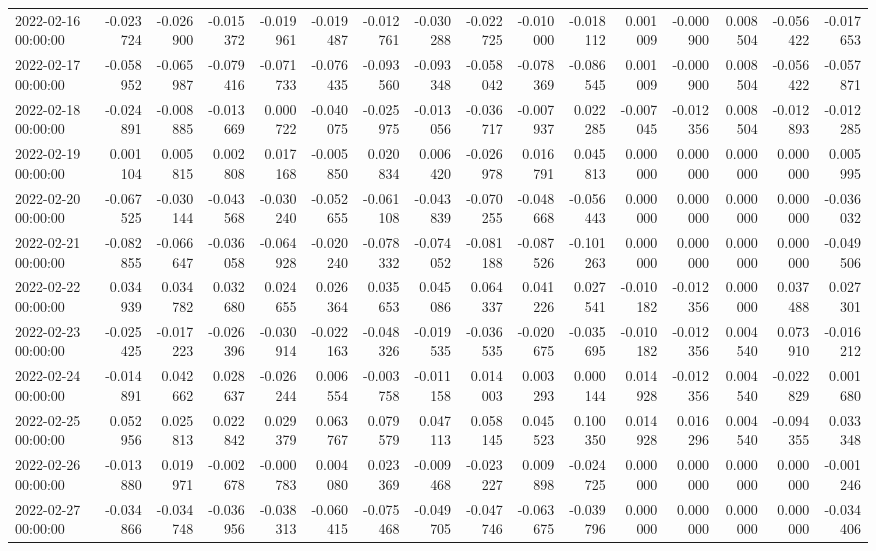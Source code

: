 \begin{tabular}{lrrrrrrrrrrrrrrr}
2022-02-16 00:00:00 & -0.023724 & -0.026900 & -0.015372 & -0.019961 & -0.019487 & -0.012761 & -0.030288 & -0.022725 & -0.010000 & -0.018112 & 0.001009 & -0.000900 & 0.008504 & -0.056422 & -0.017653 \\
2022-02-17 00:00:00 & -0.058952 & -0.065987 & -0.079416 & -0.071733 & -0.076435 & -0.093560 & -0.093348 & -0.058042 & -0.078369 & -0.086545 & 0.001009 & -0.000900 & 0.008504 & -0.056422 & -0.057871 \\
2022-02-18 00:00:00 & -0.024891 & -0.008885 & -0.013669 & 0.000722 & -0.040075 & -0.025975 & -0.013056 & -0.036717 & -0.007937 & 0.022285 & -0.007045 & -0.012356 & 0.008504 & -0.012893 & -0.012285 \\
2022-02-19 00:00:00 & 0.001104 & 0.005815 & 0.002808 & 0.017168 & -0.005850 & 0.020834 & 0.006420 & -0.026978 & 0.016791 & 0.045813 & 0.000000 & 0.000000 & 0.000000 & 0.000000 & 0.005995 \\
2022-02-20 00:00:00 & -0.067525 & -0.030144 & -0.043568 & -0.030240 & -0.052655 & -0.061108 & -0.043839 & -0.070255 & -0.048668 & -0.056443 & 0.000000 & 0.000000 & 0.000000 & 0.000000 & -0.036032 \\
2022-02-21 00:00:00 & -0.082855 & -0.066647 & -0.036058 & -0.064928 & -0.020240 & -0.078332 & -0.074052 & -0.081188 & -0.087526 & -0.101263 & 0.000000 & 0.000000 & 0.000000 & 0.000000 & -0.049506 \\
2022-02-22 00:00:00 & 0.034939 & 0.034782 & 0.032680 & 0.024655 & 0.026364 & 0.035653 & 0.045086 & 0.064337 & 0.041226 & 0.027541 & -0.010182 & -0.012356 & 0.000000 & 0.037488 & 0.027301 \\
2022-02-23 00:00:00 & -0.025425 & -0.017223 & -0.026396 & -0.030914 & -0.022163 & -0.048326 & -0.019535 & -0.036535 & -0.020675 & -0.035695 & -0.010182 & -0.012356 & 0.004540 & 0.073910 & -0.016212 \\
2022-02-24 00:00:00 & -0.014891 & 0.042662 & 0.028637 & -0.026244 & 0.006554 & -0.003758 & -0.011158 & 0.014003 & 0.003293 & 0.000144 & 0.014928 & -0.012356 & 0.004540 & -0.022829 & 0.001680 \\
2022-02-25 00:00:00 & 0.052956 & 0.025813 & 0.022842 & 0.029379 & 0.063767 & 0.079579 & 0.047113 & 0.058145 & 0.045523 & 0.100350 & 0.014928 & 0.016296 & 0.004540 & -0.094355 & 0.033348 \\
2022-02-26 00:00:00 & -0.013880 & 0.019971 & -0.002678 & -0.000783 & 0.004080 & 0.023369 & -0.009468 & -0.023227 & 0.009898 & -0.024725 & 0.000000 & 0.000000 & 0.000000 & 0.000000 & -0.001246 \\
2022-02-27 00:00:00 & -0.034866 & -0.034748 & -0.036956 & -0.038313 & -0.060415 & -0.075468 & -0.049705 & -0.047746 & -0.063675 & -0.039796 & 0.000000 & 0.000000 & 0.000000 & 0.000000 & -0.034406 \\

\end{tabular}
